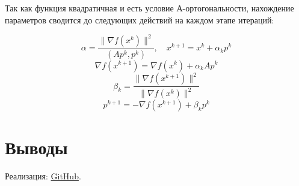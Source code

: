 \documentclass[12pt]{article}
\begin{document}
Так как функция квадратичная и есть условие А-ортогональности, нахождение параметров сводится до следующих действий на каждом этапе итераций:

\[ \alpha = \frac{\lVert \nabla f(x^k) \rVert^2}{\left(Ap^k, p^k\right)}, \quad x^{k+1} = x^k+\alpha_k p^k \]
\[ \nabla f(x^{k+1}) = \nabla f(x^k) + \alpha_k Ap^k \]
\[ \beta_k = \frac{\lVert \nabla f(x^{k+1}) \rVert ^2}{\lVert \nabla f(x^{k}) \rVert ^2} \] 
\[ p^{k+1} = -\nabla f(x^{k+1}) + \beta_k p^k \]

\newpage
\section{Выводы}


Реализация: \href{https://github.com/Mr3zee/ITMO-Optimization-Methods-LAB2-2021/}{GitHub}.
\end{document}
